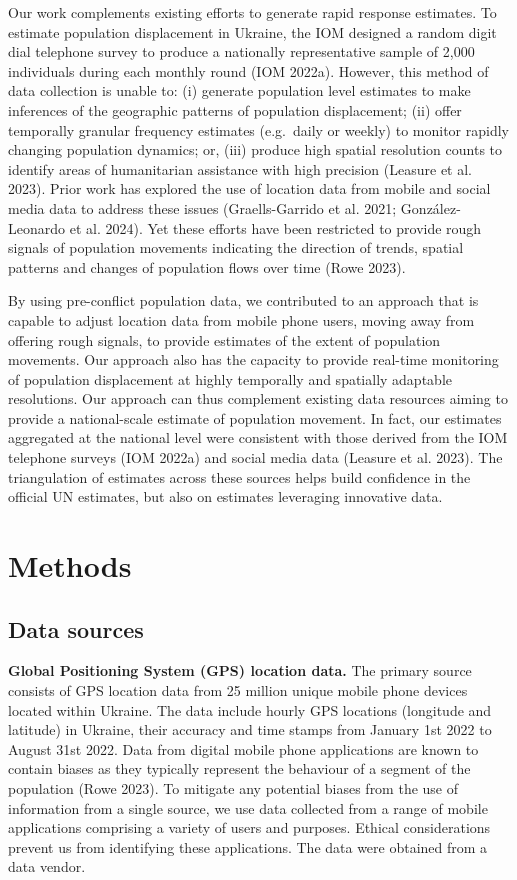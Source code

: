 \documentclass[
  sn-nature,
  11pt,
]{sn-jnl}
\begin{document}
Our work complements existing efforts to generate rapid response
estimates. To estimate population displacement in Ukraine, the IOM
designed a random digit dial telephone survey to produce a nationally
representative sample of 2,000 individuals during each monthly round
(IOM 2022a). However, this method of data collection is unable to: (i)
generate population level estimates to make inferences of the geographic
patterns of population displacement; (ii) offer temporally granular
frequency estimates (e.g.~daily or weekly) to monitor rapidly changing
population dynamics; or, (iii) produce high spatial resolution counts to
identify areas of humanitarian assistance with high precision (Leasure
et al. 2023). Prior work has explored the use of location data from
mobile and social media data to address these issues (Graells-Garrido et
al. 2021; González-Leonardo et al. 2024). Yet these efforts have been
restricted to provide rough signals of population movements indicating
the direction of trends, spatial patterns and changes of population
flows over time (Rowe 2023).

By using pre-conflict population data, we contributed to an approach
that is capable to adjust location data from mobile phone users, moving
away from offering rough signals, to provide estimates of the extent of
population movements. Our approach also has the capacity to provide
real-time monitoring of population displacement at highly temporally and
spatially adaptable resolutions. Our approach can thus complement
existing data resources aiming to provide a national-scale estimate of
population movement. In fact, our estimates aggregated at the national
level were consistent with those derived from the IOM telephone surveys
(IOM 2022a) and social media data (Leasure et al. 2023). The
triangulation of estimates across these sources helps build confidence
in the official UN estimates, but also on estimates leveraging
innovative data.

\section{Methods}\label{methods}

\subsection{Data sources}\label{sec-data-sources}

\textbf{Global Positioning System (GPS) location data.} The primary
source consists of GPS location data from 25 million unique mobile phone
devices located within Ukraine. The data include hourly GPS locations
(longitude and latitude) in Ukraine, their accuracy and time stamps from
January 1st 2022 to August 31st 2022. Data from digital mobile phone
applications are known to contain biases as they typically represent the
behaviour of a segment of the population (Rowe 2023). To mitigate any
potential biases from the use of information from a single source, we
use data collected from a range of mobile applications comprising a
variety of users and purposes. Ethical considerations prevent us from
identifying these applications. The data were obtained from a data
vendor.
\end{document}
